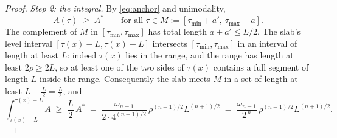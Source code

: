 \begin{proof}
\emph{Step 2: the integral.}  By \eqref{eq:anchor} and unimodality,
\[
A(\tau)\;\ge\;A^*
\qquad\text{for all }
\tau\in M:=[\tau_{\min}+a',\ \tau_{\max}-a].
\]
The complement of $M$ in $[\tau_{\min},\tau_{\max}]$ has total length
$a+a'\le L/2$.  The slab's level interval
$[\tau(x)-L,\tau(x)+L]$ intersects $[\tau_{\min},\tau_{\max}]$ in an interval
of length at least $L$: indeed $\tau(x)$ lies in the range, and the range has
length at least $2\rho\ge2L$, so at least one of the two sides of $\tau(x)$
contains a full segment of length $L$ inside the range.  Consequently the slab
meets $M$ in a set of length at least $L-\frac L2=\frac L2$, and
\[
\int_{\tau(x)-L}^{\tau(x)+L}A
\;\ge\;\frac L2\,A^*
\;=\;\frac{\omega_{n-1}}{2\cdot4^{(n-1)/2}}\,\rho^{(n-1)/2}L^{(n+1)/2}
\;=\;\frac{\omega_{n-1}}{2^{\,n}}\,\rho^{(n-1)/2}L^{(n+1)/2}.
\]
\end{proof}
